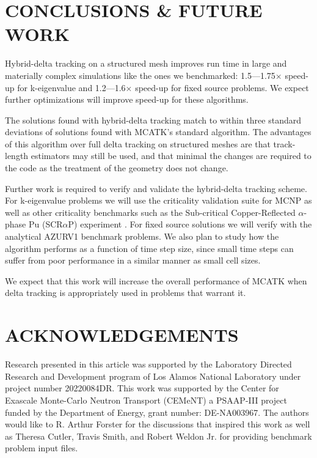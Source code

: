 \section{CONCLUSIONS \& FUTURE WORK}
Hybrid-delta tracking on a structured mesh improves run time in large and materially complex simulations like the ones we benchmarked: 1.5---1.75$\times$ speed-up for k-eigenvalue and 1.2---1.6$\times$ speed-up for fixed source problems.
We expect further optimizations will improve speed-up for these algorithms.

The solutions found with hybrid-delta tracking match to within three standard deviations of solutions found with MCATK's standard algorithm. 
The advantages of this algorithm over full delta tracking on structured meshes are that track-length estimators may still be used, and that minimal the changes are required to the code as the treatment of the geometry does not change.

Further work is required to verify and validate the hybrid-delta tracking scheme.
For k-eigenvalue problems we will use the criticality validation suite for MCNP \cite{mcnpCriticality} as well as other criticality benchmarks such as the Sub-critical Copper-Reflected $\alpha$-phase Pu (SCR$\alpha$P) experiment \cite{ICSBEP_2020}.
For fixed source solutions we will verify with the analytical AZURV1 \cite{ganapol_homogeneous_2001} benchmark problems. We also plan to study how the algorithm performs as a function of time step size, since small time steps can suffer from poor performance in a similar manner as small cell sizes.

We expect that this work will increase the overall performance of MCATK when delta tracking is appropriately used in problems that warrant it.

\section*{ACKNOWLEDGEMENTS}
Research presented in this article was supported by the Laboratory Directed Research and Development program of Los Alamos National Laboratory under project number 20220084DR.
%
This work was supported by the Center for Exascale Monte-Carlo Neutron Transport (CEMeNT) a PSAAP-III project funded by the Department of Energy, grant number: DE-NA003967.
%
The authors would like to R. Arthur Forster for the discussions that inspired this work as well as Theresa Cutler, Travis Smith, and Robert Weldon Jr. for providing benchmark problem input files.

